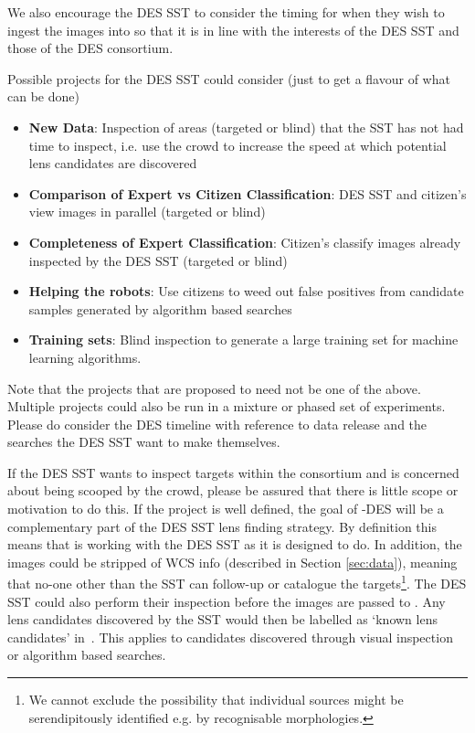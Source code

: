 \documentclass[a4paper,twocolumn]{article}
\begin{document}
We also encourage the DES SST to consider the timing for when they wish to ingest the images into \SW so that it is in line with the interests of the DES SST and those of the DES consortium.

Possible projects for the DES SST could consider (just to get a flavour of what can be done)
\begin{itemize}
\item \textbf{New Data}: Inspection of areas (targeted or blind) that the SST has not had time to inspect, i.e. use the crowd to increase the speed at which potential lens candidates are discovered
\item \textbf{Comparison of Expert vs Citizen Classification}: DES SST and citizen's view images in parallel (targeted or blind)
\item \textbf{Completeness of Expert Classification}: Citizen's classify images already inspected by the DES SST (targeted or blind)
\item \textbf{Helping the robots}: Use citizens to weed out false positives from candidate samples generated by algorithm based searches
\item \textbf{Training sets}: Blind inspection to generate a large training set for  machine learning algorithms.
\end{itemize}

Note that the projects that are proposed to \SW need not be one of the above. Multiple projects could also be run in a mixture or phased set of experiments. Please do consider the DES timeline with reference to data release and the searches the DES SST want to make themselves.

If the DES SST wants to inspect targets within the consortium and is concerned about being scooped by the crowd, please be assured that there is little scope or motivation to do this. If the project is well defined, the goal of \SW-DES will be a complementary part of the DES SST lens finding strategy. By definition this means that \SW is working with the DES SST as it is designed to do. In addition, the images could be stripped of WCS info (described in Section \ref{sec:data}), meaning that no-one other than the SST can follow-up or catalogue the targets\footnote{We cannot exclude the possibility that individual sources might be serendipitously identified e.g. by recognisable morphologies.}.  The DES SST could also perform their inspection before the images are passed to \SW. Any lens candidates discovered by the SST would then be labelled as `known lens candidates' in \sw\,\Talk. This applies to candidates discovered through visual inspection or algorithm based searches. 
\end{document}
